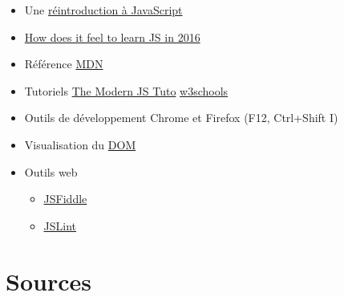 \begin{itemize}
\tightlist
\item
  Une
  \href{https://developer.mozilla.org/fr/docs/Web/JavaScript/Une_r\%C3\%A9introduction_\%C3\%A0_JavaScript}{réintroduction
  à JavaScript}
\item
  \href{https://hackernoon.com/how-it-feels-to-learn-javascript-in-2016-d3a717dd577f}{How
  does it feel to learn JS in 2016}
\item
  Référence
  \href{https://developer.mozilla.org/fr/docs/Web/JavaScript/Reference}{MDN}
\item
  Tutoriels \href{https://javascript.info/}{The Modern JS Tuto}
  \href{http://www.w3schools.com/js/}{w3schools}
\item
  Outils de développement Chrome et Firefox (F12, Ctrl+Shift I)
\item
  Visualisation du \href{http://bioub.github.io/dom-visualizer/}{DOM}
\item
  Outils web

  \begin{itemize}
  \tightlist
  \item
    \href{https://jsfiddle.net/}{JSFiddle}
  \item
    \href{http://www.jslint.com/}{JSLint}
  \end{itemize}
\end{itemize}

\hypertarget{sources}{%
\section{Sources}\label{sources}}
